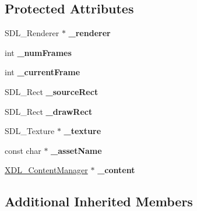 \subsection*{Protected Attributes}
\begin{DoxyCompactItemize}
\item 
\hypertarget{class_x_d_l___sprite_aedcf07ef73df095eb6cd9843870cd002}{S\-D\-L\-\_\-\-Renderer $\ast$ {\bfseries \-\_\-renderer}}\label{class_x_d_l___sprite_aedcf07ef73df095eb6cd9843870cd002}

\item 
\hypertarget{class_x_d_l___sprite_a64b44e17128d166f81a5ad0a3f1f0130}{int {\bfseries \-\_\-num\-Frames}}\label{class_x_d_l___sprite_a64b44e17128d166f81a5ad0a3f1f0130}

\item 
\hypertarget{class_x_d_l___sprite_a400af77ad887dec8bdb210e04299259a}{int {\bfseries \-\_\-current\-Frame}}\label{class_x_d_l___sprite_a400af77ad887dec8bdb210e04299259a}

\item 
\hypertarget{class_x_d_l___sprite_a98c75cc4f4abc07331ad8de391a19675}{S\-D\-L\-\_\-\-Rect {\bfseries \-\_\-source\-Rect}}\label{class_x_d_l___sprite_a98c75cc4f4abc07331ad8de391a19675}

\item 
\hypertarget{class_x_d_l___sprite_ad83f66f89a449230516e37534a228af7}{S\-D\-L\-\_\-\-Rect {\bfseries \-\_\-draw\-Rect}}\label{class_x_d_l___sprite_ad83f66f89a449230516e37534a228af7}

\item 
\hypertarget{class_x_d_l___sprite_a8e385099b36a25f00322acd2b353751e}{S\-D\-L\-\_\-\-Texture $\ast$ {\bfseries \-\_\-texture}}\label{class_x_d_l___sprite_a8e385099b36a25f00322acd2b353751e}

\item 
\hypertarget{class_x_d_l___sprite_a8e50211a0f424c3a77753a206232f9ef}{const char $\ast$ {\bfseries \-\_\-asset\-Name}}\label{class_x_d_l___sprite_a8e50211a0f424c3a77753a206232f9ef}

\item 
\hypertarget{class_x_d_l___sprite_a39231e3b79b80ebb38cc9c9d5e1b4323}{\hyperlink{class_x_d_l___content_manager}{X\-D\-L\-\_\-\-Content\-Manager} $\ast$ {\bfseries \-\_\-content}}\label{class_x_d_l___sprite_a39231e3b79b80ebb38cc9c9d5e1b4323}

\end{DoxyCompactItemize}
\subsection*{Additional Inherited Members}


